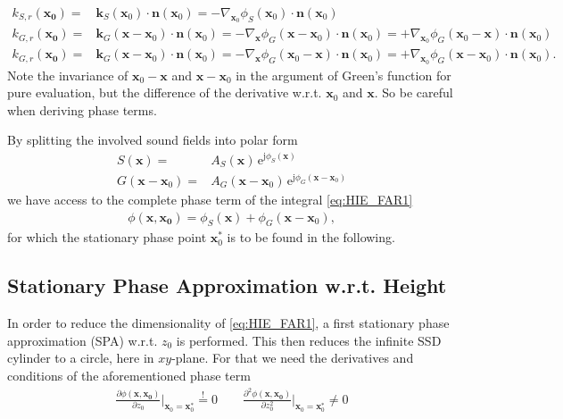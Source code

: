 \documentclass[a4paper,BCOR=15mm,10pt,twoside]{scrartcl}
\newcommand\e{\mathrm{e}}  %
\newcommand\im{\mathrm{j}}  %
\renewcommand{\vec}[1]{\mathbf{#1}}  %
\newcommand\unitn{\vec{n}}  %
\begin{document}
\begin{align}
k_{S,r}(\vec{x_0}) =& \vec{k}_S(\vec{x}_0) \cdot \unitn(\vec{x}_0) = - \nabla_{\vec{x}_0}\phi_S(\vec{x}_0) \cdot \unitn(\vec{x}_0)\\
k_{G,r}(\vec{x_0}) =& \vec{k}_G(\vec{x}-\vec{x}_0) \cdot \unitn(\vec{x}_0) = -\nabla_\vec{x}\phi_G(\vec{x}-\vec{x}_0) \cdot \unitn(\vec{x}_0) = + \nabla_{\vec{x}_0} \phi_G(\vec{x}_0-\vec{x}) \cdot \unitn(\vec{x}_0)\\
k_{G,r}(\vec{x_0}) =& \vec{k}_G(\vec{x}-\vec{x}_0) \cdot \unitn(\vec{x}_0) = -\nabla_\vec{x}\phi_G(\vec{x}_0-\vec{x}) \cdot \unitn(\vec{x}_0) = + \nabla_{\vec{x}_0} \phi_G(\vec{x}-\vec{x}_0) \cdot \unitn(\vec{x}_0).
\end{align}
Note the invariance of $\vec{x}_0-\vec{x}$ and $\vec{x}-\vec{x}_0$ in the argument of Green's function for pure evaluation, but the difference of the derivative w.r.t. $\vec{x}_0$ and $\vec{x}$. So be careful when deriving phase terms.
%

By splitting the involved sound fields into polar form
\begin{align}
S(\vec{x}) =& A_S(\vec{x}) \, \e^{\im \phi_S(\vec{x})}\\
G(\vec{x}-\vec{x}_0) =& A_G(\vec{x}-\vec{x}_0) \, \e^{\im \phi_G(\vec{x}-\vec{x}_0)}
\end{align}
%
we have access to the complete phase term of the integral \eqref{eq:HIE_FAR1}
%
\begin{align}
\phi(\vec{x}, \vec{x_0}) = \phi_{S}(\vec{x})  + \phi_{G}(\vec{x}-\vec{x}_0),
\end{align}
%
for which the stationary phase point $\vec{x}_0^*$ is to be found in the following.

\subsection{Stationary Phase Approximation w.r.t. Height}
In order to reduce the dimensionality of \eqref{eq:HIE_FAR1}, a first stationary phase approximation (SPA) w.r.t. $z_0$ is performed.
This then reduces the infinite SSD cylinder to a circle, here in $xy$-plane.
For that we need the derivatives and conditions of the aforementioned phase term
%
\begin{align}
\frac{\partial \phi(\vec{x}, \vec{x_0})}{\partial z_0}\bigg|_{\vec{x}_0=\vec{x}_0^*} \stackrel{!}{=} 0 \qquad
\frac{\partial^2 \phi(\vec{x}, \vec{x_0})}{\partial z_0^2}\bigg|_{\vec{x}_0=\vec{x}_0^*} \neq 0
\end{align}
%
\end{document}
